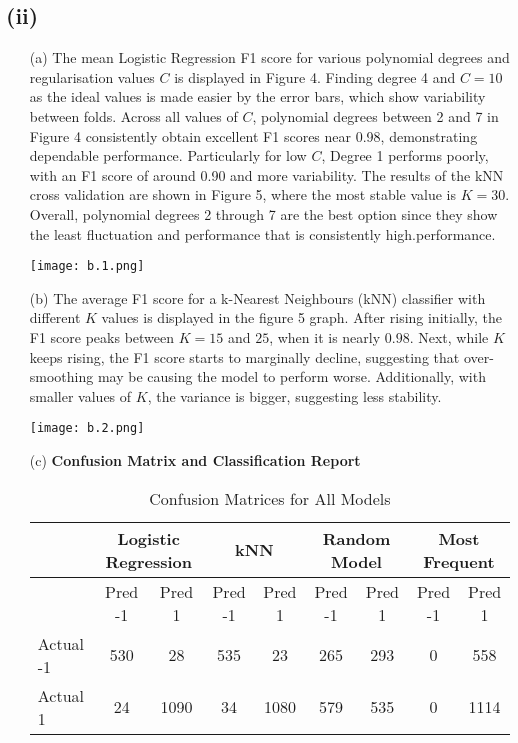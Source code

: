 \documentclass[a4paper,10pt]{article}
\begin{document}
\subsection*{(ii)}
\begin{enumerate}
    \item[(a)] 
    The mean Logistic Regression F1 score for various polynomial degrees and regularisation values $C$ is displayed in Figure 4. Finding degree 4 and $C = 10$ as the ideal values is made easier by the error bars, which show variability between folds. Across all values of $C$, polynomial degrees between 2 and 7 in Figure 4 consistently obtain excellent F1 scores near 0.98, demonstrating dependable performance. Particularly for low $C$, Degree 1 performs poorly, with an F1 score of around 0.90 and more variability. The results of the kNN cross validation are shown in Figure 5, where the most stable value is $K = 30$. Overall, polynomial degrees 2 through 7 are the best option since they show the least fluctuation and performance that is consistently high.performance.    
\begin{center}
        \centering
        \texttt{[image: b.1.png]}
        \label{}
    \end{center}
\item[(b)]   
The average F1 score for a k-Nearest Neighbours (kNN) classifier with different $K$ values is displayed in the figure 5 graph. After rising initially, the F1 score peaks between $K = 15$ and $25$, when it is nearly $0.98$. Next, while $K$ keeps rising, the F1 score starts to marginally decline, suggesting that over-smoothing may be causing the model to perform worse. Additionally, with smaller values of $K$, the variance is bigger, suggesting less stability.    
       \begin{center}
        \centering
        \texttt{[image: b.2.png]}
        \label{}
    \end{center} 

\item[(c)] \textbf{Confusion Matrix and Classification Report} \\
\begin{table}[ht]
    \centering
    \caption{Confusion Matrices for All Models}
    \begin{tabular}{l|cc|cc|cc|cc}
        \hline
        & \multicolumn{2}{c|}{Logistic Regression} & \multicolumn{2}{c|}{kNN} & \multicolumn{2}{c|}{Random Model} & \multicolumn{2}{c}{Most Frequent} \\
        \hline
        & Pred -1 & Pred 1 & Pred -1 & Pred 1 & Pred -1 & Pred 1 & Pred -1 & Pred 1 \\
        \hline
        Actual -1 & 530 & 28 & 535 & 23 & 265 & 293 & 0 & 558 \\
        Actual 1  & 24 & 1090 & 34 & 1080 & 579 & 535 & 0 & 1114 \\
        \hline
    \end{tabular}
    \label{tab:confusion_matrices}
\end{table}


\end{enumerate}
\end{document}
